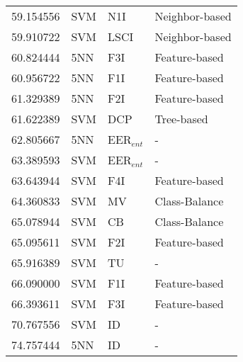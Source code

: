 \begin{tabular}{rlll}
59.154556 & SVM & N1I & Neighbor-based \\
59.910722 & SVM & LSCI & Neighbor-based \\
60.824444 & 5NN & F3I & Feature-based \\
60.956722 & 5NN & F1I & Feature-based \\
61.329389 & 5NN & F2I & Feature-based \\
61.622389 & SVM & DCP & Tree-based \\
62.805667 & 5NN & EER$_{ent}$ & - \\
63.389593 & SVM & EER$_{ent}$ & - \\
63.643944 & SVM & F4I & Feature-based \\
64.360833 & SVM & MV & Class-Balance \\
65.078944 & SVM & CB & Class-Balance \\
65.095611 & SVM & F2I & Feature-based \\
65.916389 & SVM & TU & - \\
66.090000 & SVM & F1I & Feature-based \\
66.393611 & SVM & F3I & Feature-based \\
70.767556 & SVM & ID & - \\
74.757444 & 5NN & ID & - \\
\bottomrule
\end{tabular}
